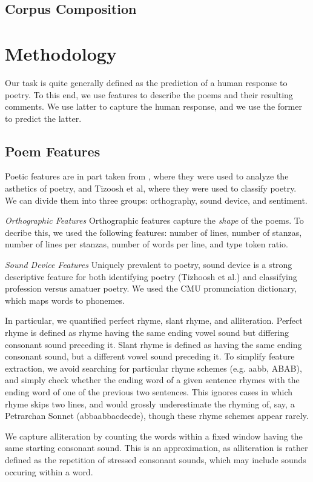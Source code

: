 \documentclass[11pt]{article}
\begin{document}
\subsection*{Corpus Composition}

\section{Methodology}
Our task is quite generally defined as the prediction of a human response to poetry. To this end, we use features to describe the poems and their resulting comments. We use latter to capture the human response, and we use the former to predict the latter.

\subsection*{Poem Features}
Poetic features are in part taken from , where they were used to analyze the asthetics of poetry, and Tizoosh et al, where they were used to classify poetry. We can divide them into three groups: orthography, sound device, and sentiment.

\emph{Orthographic Features}
Orthographic features capture the \emph{shape} of the poems. To decribe this, we used the following features: number of lines, number of stanzas, number of lines per stanzas, number of words per line, and type token ratio.

\emph{Sound Device Features}
Uniquely prevalent to poetry, sound device is a strong descriptive feature for both identifying poetry (Tizhoosh et al.) and classifying profession versus amatuer poetry. We used the CMU pronunciation dictionary, which maps words to phonemes.

In particular, we quantified perfect rhyme, slant rhyme, and alliteration. Perfect rhyme is defined as rhyme having the same ending vowel sound but differing consonant sound preceding it. Slant rhyme is defined as having the same ending consonant sound, but a different vowel sound preceding it. To simplify feature extraction, we avoid searching for particular rhyme schemes (e.g. aabb, ABAB), and simply check whether the ending word of a given sentence rhymes with the ending word of one of the previous two sentences. This ignores cases in which rhyme skips two lines, and would grossly underestimate the rhyming of, say, a Petrarchan Sonnet (abbaabbacdecde), though these rhyme schemes appear rarely.

We capture alliteration by counting the words within a fixed window having the same starting consonant sound. This is an approximation, as alliteration is rather defined as the repetition of stressed consonant sounds, which may include sounds occuring within a word.
\end{document}
